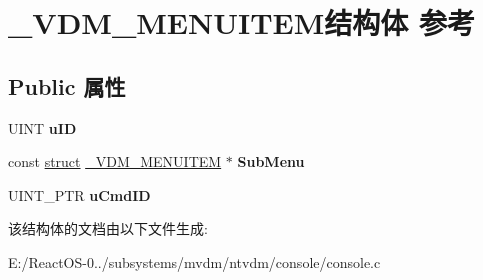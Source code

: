 \hypertarget{struct___v_d_m___m_e_n_u_i_t_e_m}{}\section{\+\_\+\+V\+D\+M\+\_\+\+M\+E\+N\+U\+I\+T\+E\+M结构体 参考}
\label{struct___v_d_m___m_e_n_u_i_t_e_m}
\subsection*{Public 属性}
\begin{DoxyCompactItemize}
\item 
\mbox{\label{struct___v_d_m___m_e_n_u_i_t_e_m_aaeb147958a9473e54a415451ae1159fb}} 
U\+I\+NT {\bfseries u\+ID}
\item 
\mbox{\label{struct___v_d_m___m_e_n_u_i_t_e_m_a6194de97042bfdcc9a7864cc542419a0}} 
const \hyperlink{interfacestruct}{struct} \hyperlink{struct___v_d_m___m_e_n_u_i_t_e_m}{\+\_\+\+V\+D\+M\+\_\+\+M\+E\+N\+U\+I\+T\+EM} $\ast$ {\bfseries Sub\+Menu}
\item 
\mbox{\label{struct___v_d_m___m_e_n_u_i_t_e_m_a967bb84c45317b44a26b7f493c259b56}} 
U\+I\+N\+T\+\_\+\+P\+TR {\bfseries u\+Cmd\+ID}
\end{DoxyCompactItemize}


该结构体的文档由以下文件生成\+:\begin{DoxyCompactItemize}
\item 
E\+:/\+React\+O\+S-\/0../subsystems/mvdm/ntvdm/console/console.\+c\end{DoxyCompactItemize}
